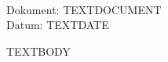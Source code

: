 ﻿\documentclass{scrartcl}
\begin{document}
\begin{tabbing}
\hspace{3cm} \= \\
Dokument: \> TEXTDOCUMENT \\
Datum: \> TEXTDATE \\
\end{tabbing}

TEXTBODY
\end{document}
